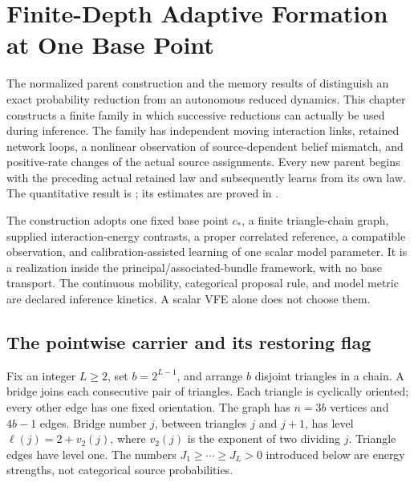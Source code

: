 \chapter{Finite-Depth Adaptive Formation at One Base Point}
\label{ch:finite-depth-formation}

The normalized parent construction and the memory results of
 distinguish an exact
probability reduction from an autonomous reduced dynamics. This chapter
constructs a finite family in which successive reductions can actually be
used during inference. The family has independent moving interaction
links, retained network loops, a nonlinear observation of source-dependent
belief mismatch, and positive-rate changes of the actual source
assignments. Every new parent begins with the preceding actual retained
law and subsequently learns from its own law. The quantitative result is
; its estimates are proved in
. 

The construction adopts one fixed base point \(c_*\), a finite
triangle-chain graph, supplied interaction-energy contrasts, a proper
correlated reference, a compatible observation, and calibration-assisted
learning of one scalar model parameter. It is a realization inside the
principal/associated-bundle framework, with no base transport. The
continuous mobility, categorical proposal rule, and model metric are
declared inference kinetics. A scalar VFE alone does not choose them.

\section{The pointwise carrier and its restoring flag}
\label{sec:rg-formation-carrier}

Fix an integer \(L\ge2\), set \(b=2^{L-1}\), and arrange \(b\) disjoint
triangles in a chain. A bridge joins each consecutive pair of triangles.
Each triangle is cyclically oriented; every other edge has one fixed
orientation. The graph has \(n=3b\) vertices and \(4b-1\) edges. Bridge
number \(j\), between triangles \(j\) and \(j+1\), has level
\(\ell(j)=2+v_2(j)\), where \(v_2(j)\) is the exponent of two dividing
\(j\). Triangle edges have level one. The numbers \(J_1\ge\cdots\ge
J_L>0\) introduced below are energy strengths, not categorical source
probabilities. 

